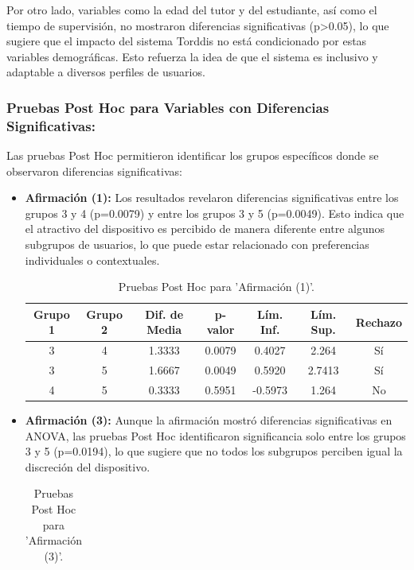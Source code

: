 \documentclass[a4paper,fleqn]{cas-sc}
\begin{document}
				Por otro lado, variables como la edad del tutor y del estudiante, así como el tiempo de supervisión, no mostraron diferencias significativas (p>0.05), lo que sugiere que el impacto del sistema Torddis no está condicionado por estas variables demográficas. Esto refuerza la idea de que el sistema es inclusivo y adaptable a diversos perfiles de usuarios.
				
			\subsubsection{Pruebas Post Hoc para Variables con Diferencias Significativas:}
				Las pruebas Post Hoc permitieron identificar los grupos específicos donde se observaron diferencias significativas:
				
				\begin{itemize}
				\item \textbf{Afirmación (1):} Los resultados revelaron diferencias significativas entre los grupos 3 y 4 (p=0.0079) y entre los grupos 3 y 5 (p=0.0049). Esto indica que el atractivo del dispositivo es percibido de manera diferente entre algunos subgrupos de usuarios, lo que puede estar relacionado con preferencias individuales o contextuales.
				\begin{table}[ht]
					\centering
					\caption{Pruebas Post Hoc para 'Afirmación (1)'.}
					\begin{tabularx}{0.75\textwidth}{ccccccc}
						\hline
						\textbf{Grupo 1} & \textbf{Grupo 2} & \textbf{Dif. de Media} & \textbf{p-valor} & \textbf{Lím. Inf.} & \textbf{Lím. Sup.} & \textbf{Rechazo} \\
						\hline
						3 & 4 & 1.3333 & 0.0079 & 0.4027 & 2.264 & Sí \\
						3 & 5 & 1.6667 & 0.0049 & 0.5920 & 2.7413 & Sí \\
						4 & 5 & 0.3333 & 0.5951 & -0.5973 & 1.264 & No \\
						\hline
					\end{tabularx}
					\label{table:posthoc_1}
				\end{table}
				\item \textbf{Afirmación (3):} Aunque la afirmación mostró diferencias significativas en ANOVA, las pruebas Post Hoc identificaron significancia solo entre los grupos 3 y 5 (p=0.0194), lo que sugiere que no todos los subgrupos perciben igual la discreción del dispositivo.
				\begin{table}[ht]
					\centering
					\caption{Pruebas Post Hoc para 'Afirmación (3)'.}
					\begin{tabularx}{0.75\textwidth}{ccccccc}

\end{tabularx}
\end{table}
\end{itemize}
\end{document}
